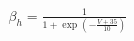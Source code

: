 \documentclass[preview]{standalone}
\begin{document}
\begin{align*}
\beta_h = \frac{1}{1 + \exp \left( -\frac{V + 35}{10} \right)}
\end{align*}
\end{document}
